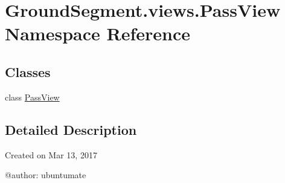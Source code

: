 \hypertarget{namespace_ground_segment_1_1views_1_1_pass_view}{}\section{Ground\+Segment.\+views.\+Pass\+View Namespace Reference}
\label{namespace_ground_segment_1_1views_1_1_pass_view}
\subsection*{Classes}
\begin{DoxyCompactItemize}
\item 
class \hyperlink{class_ground_segment_1_1views_1_1_pass_view_1_1_pass_view}{Pass\+View}
\end{DoxyCompactItemize}


\subsection{Detailed Description}
\begin{DoxyVerb}Created on Mar 13, 2017

@author: ubuntumate
\end{DoxyVerb}
 
